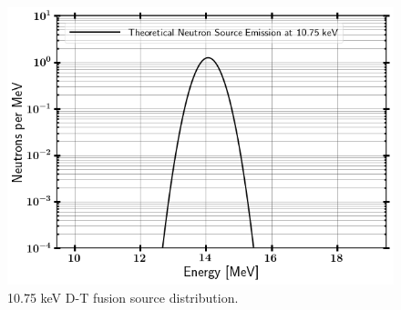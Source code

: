 \documentclass[journal]{IEEEtran}
\let\MYoriglatexcaption\caption
\renewcommand{\caption}[2][\relax]{\MYoriglatexcaption[#2]{#2}}
\begin{document}
\begin{figure}[h!]
	\includegraphics[width=\linewidth]{Figures/Applebe1075keV.png}
	\caption{10.75 keV D-T fusion source distribution.}
	\label{fig:NIFSRC}
\end{figure}
\end{document}
